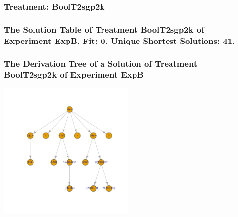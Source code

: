 \documentclass[18pt,c]{beamer}
\begin{document}
 \begin{frame}
 \fontsize{8pt}{9pt}\selectfont
 \frametitle{ Treatment: BoolT2sgp2k }

 \label{ExpBStatsTable017.tex}  
 \end{frame}

 \begin{frame}
 \fontsize{8pt}{9pt}\selectfont
 \frametitle{ The Solution Table of Treatment BoolT2sgp2k of Experiment ExpB. Fit: 0. Unique Shortest Solutions: 41. }

 \label{ExpBSolutionTable010.tex}  
 \end{frame}

 \begin{frame}
 \frametitle{ The Derivation Tree of a Solution of Treatment BoolT2sgp2k of Experiment ExpB }
 \begin{center}
\includegraphics[width=0.5\textwidth, angle=0]
{ExpBDerivationTreeFigure010.pdf}
 \end{center}
 \label{report/ExpBDerivationTreeFigure010.pdf}  
 \end{frame}
\end{document}
